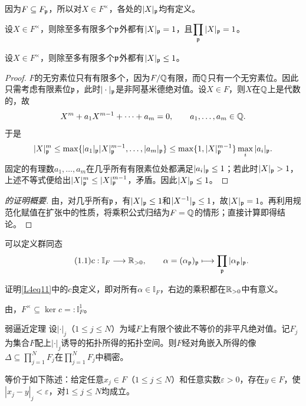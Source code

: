 因为$F\subseteq F_{\mathfrak{p}}$，所以对$X\in F^\times$，各处的$|X|_{\mathfrak{p}}$均有定义。
\begin{theorem}\label{L4S1O1}
设$X\in F^\times$，则除至多有限多个$\mathfrak{p}$外都有$|X|_{\mathfrak{p}}=1$，且$\displaystyle\prod_{\mathfrak{p}}|X|_{\mathfrak{p}}=1$。
\end{theorem}
\begin{lemma}\label{L4S1O2}
设$X\in F^\times$，则除至多有限多个$\mathfrak{p}$外都有$|X|_{\mathfrak{p}}\leq1$。
\end{lemma}
\begin{proof}
$F$的无穷素位只有有限多个，因为$F/\mathbb{Q}$有限，而$\mathbb{Q}$只有一个无穷素位。因此只需考虑有限素位$\mathfrak{p}$，此时$|\cdot|_{\mathfrak{p}}$是非阿基米德绝对值。设$X\in F$，则$X$在$\mathbb{Q}$上是代数的，故
\[X^m+a_1X^{m-1}+\cdots+a_m=0,\qquad a_1,\ldots,a_m\in\mathbb{Q}.\]
于是
\[|X|_{\mathfrak{p}}^m\leq\max\{|a_1|_{\mathfrak{p}}|X|_{\mathfrak{p}}^{m-1},\ldots,|a_m|_{\mathfrak{p}}\}\leq\max\{1,|X|_{\mathfrak{p}}^{m-1}\}\max_i|a_i|_{\mathfrak{p}}.\]
固定的有理数$a_1,\ldots,a_m$在几乎所有有限素位处都满足$|a_i|_{\mathfrak{p}}\leq1$；若此时$|X|_{\mathfrak{p}}>1$，上述不等式便给出$|X|_{\mathfrak{p}}^m\leq|X|_{\mathfrak{p}}^{m-1}$，矛盾。因此$|X|_{\mathfrak{p}}\leq1$。
\end{proof}
\begin{proof}[的证明概要]
由，对几乎所有$\mathfrak{p}$，有$|X|_{\mathfrak{p}}\leq1$和$|X^{-1}|_{\mathfrak{p}}\leq1$，故$|X|_{\mathfrak{p}}=1$。再利用规范化赋值在扩张中的性质，将乘积公式归结为$F=\mathbb{Q}$的情形；直接计算即得结论。
\end{proof}
可以定义群同态
\begin{equation}\tag{1.1}\label{L4eq11}
c:\mathbb{I}_F\longrightarrow\mathbb{R}_{>0},\qquad\alpha=(\alpha_{\mathfrak{p}})_{\mathfrak{p}}\longmapsto\prod_{\mathfrak{p}}|\alpha_{\mathfrak{p}}|_{\mathfrak{p}}.
\end{equation}
\begin{exercise*}\label{L4S1EX1}
证明\eqref{L4eq11}中的$c$良定义，即对所有$\alpha\in\mathbb{I}_F$，右边的乘积都在$\mathbb{R}_{>0}$中有意义。
\end{exercise*}
由，$F^\times\subseteq\ker c=:\mathbb{I}_F^1$。
\begin{theorem}{弱逼近定理}\label{L4S1O3}
设$|\cdot|_j$（$1\leq j\leq N$）为域$F$上有限个彼此不等价的非平凡绝对值。记$F_j$为集合$F$配上$|\cdot|_j$诱导的拓扑所得的拓扑空间。则$F$经对角嵌入所得的像$\Delta\subseteq\prod_{j=1}^N F_j$在$\prod_{j=1}^N F_j$中稠密。
\end{theorem}
\begin{note}[L4S1O4]
等价于如下陈述：给定任意$x_j\in F$（$1\leq j\leq N$）和任意实数$\varepsilon>0$，存在$y\in F$，使$|x_j-y|_j<\varepsilon$，对$1\leq j\leq N$均成立。
\end{note}
